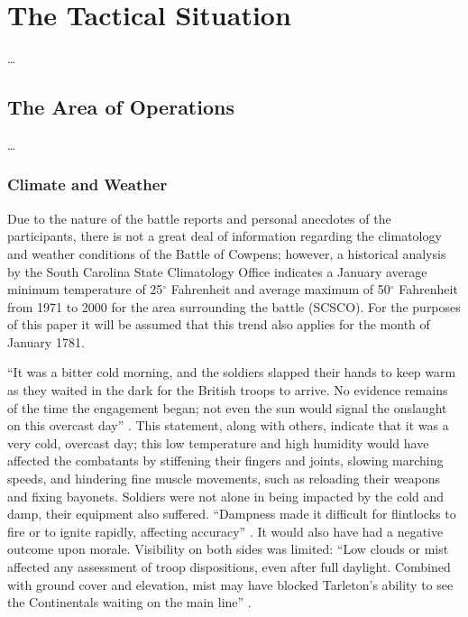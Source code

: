 \section{The Tactical Situation}

\ldots

\subsection{The Area of Operations}

\ldots

\subsubsection{Climate and Weather}

Due to the nature of the battle reports and personal anecdotes of the
participants, there is not a great deal of information regarding the
climatology and weather conditions of the Battle of Cowpens; however, a
historical analysis by the South Carolina State Climatology Office indicates a
January average minimum temperature of 25$^\circ$ Fahrenheit and average
maximum of 50$^\circ$ Fahrenheit from 1971 to 2000 for the area surrounding the
battle (SCSCO).  For the purposes of this paper it will be assumed that this
trend also applies for the month of January 1781.

``It was a bitter cold morning, and the soldiers slapped their hands to keep
warm as they waited in the dark for the British troops to arrive.  No evidence
remains of the time the engagement began; not even the sun would signal the
onslaught on this overcast day'' \cite[51]{moncure_cowpens_1996}.  This
statement, along with others, indicate that it was a very cold, overcast day;
this low  temperature and high humidity would have affected the combatants by
stiffening their fingers and joints, slowing marching speeds, and hindering
fine muscle movements, such as reloading their weapons and fixing bayonets.
Soldiers were not alone in being impacted by the cold and damp, their equipment
also suffered.  ``Dampness made it difficult for flintlocks to fire or to
ignite rapidly, affecting accuracy'' \cite[79]{babits_devil_2001}.  It would
also have had a negative outcome upon morale.  Visibility on both sides was
limited: ``Low clouds or mist affected any assessment of troop dispositions,
even after full daylight.  Combined with ground cover and elevation, mist may
have blocked Tarleton's ability to see the Continentals waiting on the main
line'' \cite[80]{babits_devil_2001}.

